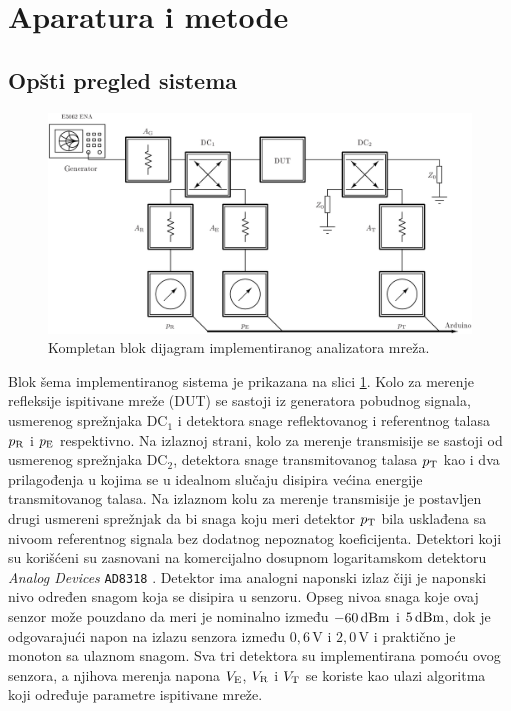 \documentclass[a4paper, 12pt, diplomski]{etf}
\newcommand{\unit}[1]{\,{\rm #1}}
\begin{document}
\newpage
\section{Aparatura i metode
}
\subsection{Opšti pregled sistema}
%
\begin{figure}[b!]
    \centering
    \includegraphics[width=\textwidth]{fig/sna_block.pdf}
    \caption{Kompletan blok dijagram implementiranog 
    analizatora mreža.}
    \label{fig:sna_complete}
\end{figure}
%
Blok šema implementiranog sistema je prikazana na slici \ref{fig:sna_complete}. 
Kolo za merenje refleksije ispitivane mreže 
(DUT)
se sastoji iz generatora pobudnog signala, usmerenog sprežnjaka DC$_1$ 
i detektora snage 
reflektovanog i referentnog talasa $p_{\rm R}$ 
i $p_{\rm E}$ respektivno. 
Na izlaznoj strani, kolo za merenje transmisije se sastoji 
od usmerenog sprežnjaka DC$_2$, 
detektora snage transmitovanog talasa $p_{\rm T}$ kao i dva prilagođenja u kojima se u idealnom slučaju disipira
 većina energije transmitovanog talasa. Na izlaznom kolu za merenje transmisije je postavljen drugi usmereni sprežnjak da bi 
 snaga koju meri detektor $p_{\rm T}$ bila usklađena sa nivoom 
 referentnog signala bez dodatnog nepoznatog koeficijenta. 
%
Detektori
 koji su korišćeni su zasnovani na komercijalno dosupnom logaritamskom detektoru
 \textit{Analog Devices}
 {\tt AD8318} \cite{ad8318}. Detektor ima analogni naponski izlaz čiji je naponski 
 nivo određen snagom koja se disipira u senzoru. Opseg
 nivoa snaga koje ovaj senzor može 
 pouzdano da meri je nominalno između $-60{\rm\,dBm}$ i $5{\rm\,dBm}$, dok je odgovarajući napon
 na izlazu senzora između $0,6\,$V i $2,0\,$V i praktično je monoton sa ulaznom snagom.
 Sva tri detektora su implementirana pomoću ovog senzora, a njihova merenja napona
 $V_{\rm E}$, $V_{\rm R}$ i $V_{\rm T}$ se koriste kao ulazi algoritma koji određuje 
 parametre ispitivane mreže. 
%
\end{document}

